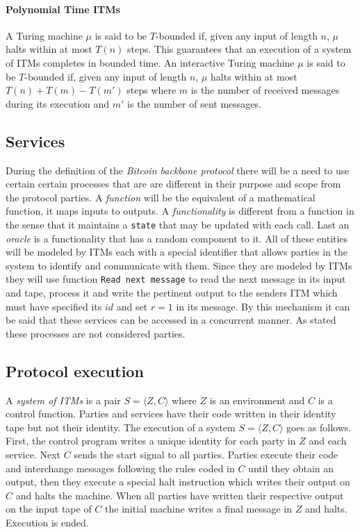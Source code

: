 \documentclass[..]{subfiles}
\begin{document}
\paragraph{Polynomial Time ITMs}

A Turing machine $\mu$ is said to be $T$-bounded if, given any input of length $n$, $\mu$ halts within at most $T(n)$ steps. This guarantees that an execution of a system of ITMs completes in bounded time. An interactive Turing machine $\mu$ is said to be $T$-bounded if, given any input of length $n$, $\mu$ halts within at most $T(n) + T(m) - T(m')$ steps where $m$ is the number of received messages during its execution and $m'$ is the number of sent messages.

\subsection{Services}

During the definition of the \textit{Bitcoin backbone protocol} there will be a need to use certain certain processes that are are different in their purpose and scope from the protocol parties. A \textit{function} will be the equivalent of a mathematical function, it maps inputs to outputs. A \textit{functionality} is different from a function in the sense that it maintains a \texttt{state} that may be updated with each call. Last an \textit{oracle} is a functionality that has a random component to it. All of these entities will be modeled by ITMs each with a special identifier that allows parties in the system to identify and communicate with them. Since they are modeled by ITMs they will use function \texttt{Read next message} to read the next message in its input and tape, process it and write the pertinent output to the senders ITM which must have specified its $id$ and set $r=1$ in its message. By this mechanism it can be said that these services can be accessed in a concurrent manner. As stated these processes are not considered parties.


\subsection{Protocol execution}

A \textit{system of ITMs} is a pair $S = \langle Z, C\rangle$ where $Z$ is an environment and $C$ is a control function. Parties and services have their code written in their identity tape but not their identity. The execution of a system $S = \langle Z, C\rangle$ goes as follows. First, the control program writes a unique identity for each party in $Z$ and each service. Next $C$ sends the start signal to all parties. Parties execute their code and interchange messages following the rules coded in $C$ until they obtain an output, then they execute a special halt instruction which writes their output on $C$ and halts the machine. When all parties have written their respective output on the input tape of $C$ the initial machine writes a final message in $Z$ and halts. Execution is ended.
\end{document}
